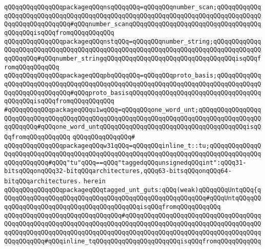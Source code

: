 \verb|qQQqqQQqqQQqqQQqpackageqQQqnsqQQqqQQq=qQQqqQQqnumber_scan;qQQqqQQqqQQqqQQqqQQqqQQqqQQqqQQqqQQqqQQqqQQqqQQqqQQqqQQqqQQqqQQqqQQqqQQqqQQqqQQqqQQqqQQqqQQqqQQqqQQq#qQQqnumber_scanqQQqqQQqqQQqqQQqqQQqqQQqqQQqqQQqqQQqqQQqqQQqisqQQqfromqQQqqQQqqQQq|\newline
\verb|qQQqqQQqqQQqqQQqpackageqQQqnstqQQq=qQQqqQQqnumber_string;qQQqqQQqqQQqqQQqqQQqqQQqqQQqqQQqqQQqqQQqqQQqqQQqqQQqqQQqqQQqqQQqqQQqqQQqqQQqqQQqqQQqqQQqqQQq#qQQqnumber_stringqQQqqQQqqQQqqQQqqQQqqQQqqQQqqQQqqQQqisqQQqfromqQQqqQQqqQQq|\newline
\verb|qQQqqQQqqQQqqQQqpackageqQQqpbqQQqqQQq=qQQqqQQqproto_basis;qQQqqQQqqQQqqQQqqQQqqQQqqQQqqQQqqQQqqQQqqQQqqQQqqQQqqQQqqQQqqQQqqQQqqQQqqQQqqQQqqQQqqQQqqQQqqQQqqQQq#qQQqproto_basisqQQqqQQqqQQqqQQqqQQqqQQqqQQqqQQqqQQqqQQqqQQqisqQQqfromqQQqqQQqqQQq|\newline
\verb|#qQQqqQQqqQQqpackageqQQqu1wqQQq=qQQqqQQqone_word_unt;qQQqqQQqqQQqqQQqqQQqqQQqqQQqqQQqqQQqqQQqqQQqqQQqqQQqqQQqqQQqqQQqqQQqqQQqqQQqqQQqqQQqqQQqqQQqqQQq#qQQqone_word_untqQQqqQQqqQQqqQQqqQQqqQQqqQQqqQQqqQQqqQQqisqQQqfromqQQqqQQqqQQq|\newline
\verb|qQQqqQQqqQQqqQQq#|\newline
\verb|qQQqqQQqqQQqqQQqpackageqQQqw31qQQq=qQQqqQQqinline_t::tu;qQQqqQQqqQQqqQQqqQQqqQQqqQQqqQQqqQQqqQQqqQQqqQQqqQQqqQQqqQQqqQQqqQQqqQQqqQQqqQQqqQQqqQQqqQQqqQQq#qQQq"tu"qQQq==qQQq"taggedqQQqunsignedqQQqint":qQQq31-bitsqQQqonqQQq32-bitqQQqarchitectures,qQQq63-bitsqQQqonqQQq64-bitqQQqarchitectures.|\newline
\verb|herein|\newline
\newline
\verb|qQQqqQQqqQQqqQQqpackageqQQqtagged_unt_guts:qQQq(weak)qQQqqQQqUntqQQq{qQQqqQQqqQQqqQQqqQQqqQQqqQQqqQQqqQQqqQQqqQQqqQQqqQQqqQQq#qQQqUntqQQqqQQqqQQqqQQqqQQqqQQqqQQqqQQqqQQqqQQqqQQqisqQQqfromqQQqqQQqqQQq|\newline
\verb|qQQqqQQqqQQqqQQqqQQqqQQqqQQqqQQq#qQQqqQQqqQQqqQQqqQQqqQQqqQQqqQQqqQQqqQQqqQQqqQQqqQQqqQQqqQQqqQQqqQQqqQQqqQQqqQQqqQQqqQQqqQQqqQQqqQQqqQQqqQQqqQQqqQQqqQQqqQQqqQQqqQQqqQQqqQQqqQQqqQQqqQQqqQQqqQQqqQQqqQQqqQQqqQQqqQQqqQQqqQQq#qQQqinline_tqQQqqQQqqQQqqQQqqQQqqQQqisqQQqfromqQQqqQQqqQQq|\newline
